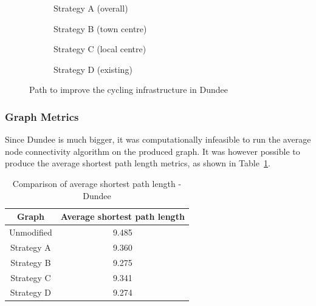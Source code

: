 \documentclass[12pt,a4paper]{report}
\begin{document}
\begin{figure}[ht]
    \centering
    \begin{subfigure}[ht]{0.47\textwidth}
        \centering
        
        \caption{Strategy A (overall)}
        \label{fig:overall dundee}
    \end{subfigure}
    \hfill
    \begin{subfigure}[ht]{0.47\textwidth}
        \centering
        
        \caption{Strategy B (town centre)}
        \label{fig:centre dundee}
    \end{subfigure}
    \hfill
    \begin{subfigure}[ht]{0.47\textwidth}
        \centering
        
        \caption{Strategy C (local centre)}
        \label{fig:local dundee}
    \end{subfigure}
    \hfill
    \begin{subfigure}[ht]{0.47\textwidth}
        \centering
        
        \caption{Strategy D (existing)}
        \label{fig:existing dundee}
    \end{subfigure}
       \caption{Path to improve the cycling infrastructure in Dundee}
       \label{fig:path dundee}
\end{figure}

\subsubsection*{Graph Metrics}
Since Dundee is much bigger, it was computationally infeasible to run the average node connectivity algorithm on the produced graph. It was however possible to produce the average shortest path length metrics, as shown in Table~\ref{tab:avg dundee}.

\begin{table}[ht!]
    \centering
    \begin{tabular}{|c|c|}
        \hline
        Graph & Average shortest path length \\
        \hline
        Unmodified & 9.485 \\
        Strategy A & 9.360 \\
        Strategy B & 9.275 \\
        Strategy C & 9.341 \\
        Strategy D & 9.274 \\
        \hline
    \end{tabular}
    \caption{Comparison of average shortest path length - Dundee}
    \label{tab:avg dundee}
\end{table}
\end{document}
